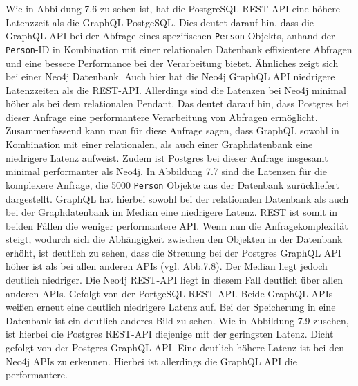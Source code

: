 \noindent
Wie in Abbildung 7.6 zu sehen ist, hat die PostgreSQL REST-API eine höhere Latenzzeit als die GraphQL PostgeSQL. Dies deutet darauf hin, dass die GraphQL API bei der Abfrage eines spezifischen \texttt{Person} Objekts, anhand der \texttt{Person}-ID in Kombination mit einer relationalen Datenbank effizientere Abfragen und eine bessere Performance bei der Verarbeitung bietet. Ähnliches zeigt sich bei einer Neo4j Datenbank. Auch hier hat die Neo4j GraphQL API niedrigere Latenzzeiten als die REST-API. Allerdings sind die Latenzen bei Neo4j minimal höher als bei dem relationalen Pendant. Das deutet darauf hin, dass Postgres bei dieser Anfrage eine performantere Verarbeitung von Abfragen ermöglicht. Zusammenfassend kann man für diese Anfrage sagen, dass GraphQL sowohl in Kombination mit einer relationalen, als auch einer Graphdatenbank eine niedrigere Latenz aufweist. Zudem ist Postgres bei dieser Anfrage insgesamt minimal performanter als Neo4j.
\newline
In Abbildung 7.7 sind die Latenzen für die komplexere Anfrage, die 5000 \texttt{Person} Objekte aus der Datenbank zurückliefert dargestellt. GraphQL hat hierbei sowohl bei der relationalen Datenbank als auch bei der Graphdatenbank im Median eine niedrigere Latenz. REST ist somit in beiden Fällen die weniger performantere API.
\newline
Wenn nun die Anfragekomplexität steigt, wodurch sich die Abhängigkeit zwischen den Objekten in der Datenbank erhöht, ist deutlich zu sehen, dass die Streuung bei der Postgres GraphQL API höher ist als bei allen anderen APIs (vgl. Abb.7.8). Der Median liegt jedoch deutlich niedriger. Die Neo4j REST-API liegt in diesem Fall deutlich über allen anderen APIs. Gefolgt von der PortgeSQL REST-API. Beide GraphQL APIs weißen erneut eine deutlich niedrigere Latenz auf.
\newline
Bei der Speicherung in eine Datenbank ist ein deutlich anderes Bild zu sehen. Wie in Abbildung 7.9 zusehen, ist hierbei die Postgres REST-API diejenige mit der geringsten Latenz. Dicht gefolgt von der Postgres GraphQL API. Eine deutlich höhere Latenz ist bei den Neo4j APIs zu erkennen. Hierbei ist allerdings die GraphQL API die performantere.


